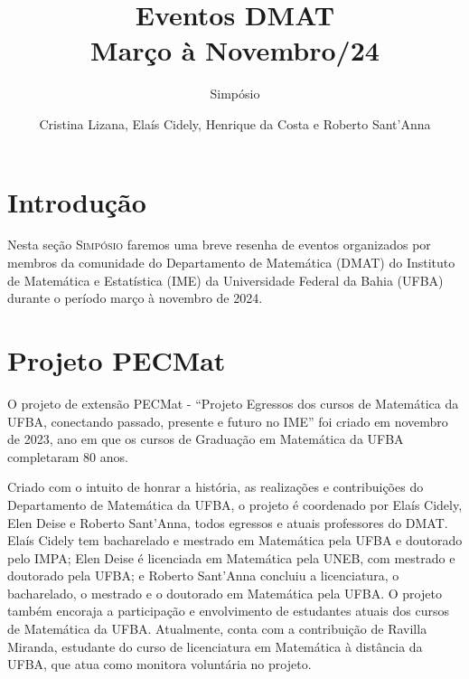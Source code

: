 \documentclass{hipatia}
\title{Eventos DMAT \\ Março à Novembro/24}
\subtitle{Simpósio}
\author{Cristina Lizana, Elaís Cidely, Henrique da Costa e Roberto Sant'Anna}
\newcommand{\superou}{\textsuperscript{\underline{o}}~}
\begin{document}
\setcounter{page}{\simposiopage}
\maketitle



\section{Introdução}

Nesta seção \textsc{Simpósio}  faremos uma breve resenha de eventos organizados por membros da comunidade do Departamento de Matemática (DMAT) do Instituto de Matemática e Estatística (IME) da Universidade Federal da Bahia (UFBA) durante o período março à novembro de 2024. 


%
%

\section{Projeto PECMat}

O projeto de extensão PECMat - ``Projeto Egressos dos cursos de Matemática da UFBA, conectando passado, presente e futuro no IME'' foi criado em novembro de 2023, ano em que os cursos de Graduação em Matemática da UFBA completaram  80 anos.

Criado com o intuito de honrar a história, as  realizações e contribuições do Departamento de Matemática da UFBA, o projeto é coordenado por Elaís Cidely, Elen Deise e Roberto Sant'Anna, todos egressos e atuais professores do DMAT. Elaís Cidely tem bacharelado e mestrado em Matemática pela UFBA e doutorado pelo IMPA; Elen Deise é licenciada em Matemática pela UNEB, com mestrado e doutorado pela UFBA; e Roberto Sant'Anna concluiu a licenciatura, o bacharelado, o mestrado e o doutorado em Matemática pela UFBA. O projeto também encoraja a participação e envolvimento de estudantes atuais dos cursos de Matemática da UFBA. Atualmente, conta com a contribuição de Ravilla Miranda, estudante do curso de licenciatura em Matemática à distância da UFBA, que atua como monitora voluntária no projeto.
\end{document}
